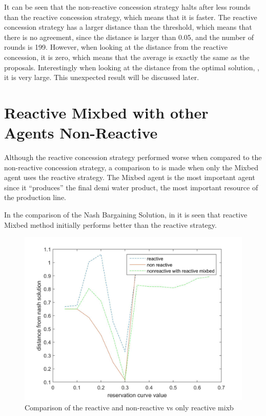 It can be seen that the non-reactive concession strategy halts after less rounds than the reactive concession strategy, which means that it is faster. The reactive concession strategy has a larger distance than the threshold, which means that there is no agreement, since the distance is larger than 0.05, and the number of rounds is 199. However, when looking at the distance from the reactive concession, it is zero, which means that the average is exactly the same as the proposals. Interestingly when looking at the distance from the optimal solution, , it is very large. This unexpected result will be discussed later. 
\clearpage
\section{Reactive Mixbed with other Agents Non-Reactive }
Although the reactive concession strategy performed worse when compared to the non-reactive concession strategy, a comparison to is made when only the Mixbed agent uses the reactive strategy. The Mixbed agent is the most important agent since it ``produces'' the final demi water product, the most important resource of the production line.

In the comparison of the Nash Bargaining Solution, in  it is seen that reactive Mixbed  method initially performs better than the reactive strategy. 


\begin{figure}[h]
	\centering
	\includegraphics[width=0.9\linewidth]{img/reactivevsnonreactivevsMixbedrea}
	\caption{Comparison of the reactive and non-reactive vs only reactive mixb}
	\label{fig:reactivevsnon-reactivevsnon-reactivemxbrea}
\end{figure}

